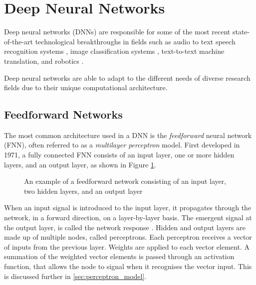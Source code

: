 \section{Deep Neural Networks}\label{sec:deep_neural_networks}
Deep neural networks (DNNs) are responsible for some of the most recent state-of-the-art technological breakthroughs in fields such as audio to text speech recognition systems \cite{Hinton2012}, image classification systems \cite{Krizhevsky2012, Simonyan2014, Szegedy2015, He2016}, text-to-text machine translation, and robotics \cite{Mnih2015, Lillicrap2015, Schulman2015, Schulman2015highdimensional}.

Deep neural networks are able to adapt to the different needs of diverse research fields due to their unique computational architecture.


\subsection{Feedforward Networks}\label{sec:feedfoorward_networks}
The most common architecture used in a DNN is the \textit{feedforward} neural network (FNN), often referred to as a \textit{multilayer perceptron} model. First developed in 1971, a fully connected FNN consists of an input layer, one or more hidden layers, and an output layer, as shown in Figure \ref{fig:2302_feedforward_network}.

\begin{figure}[h]
	\centering
	
	\caption[Feedforward network example]{An example of a feedforward network consisting of an input layer, two hidden layers, and an output layer}
	\label{fig:2302_feedforward_network}
\end{figure}

When an input signal is introduced to the input layer, it propagates through the network, in a forward direction, on a layer-by-layer basis. The emergent signal at the output layer, is called the network response \cite{Haykin99}. Hidden and output layers are made up of multiple nodes, called perceptrons. Each perceptron receives a vector of inputs from the previous layer. Weights are applied to each vector element. A summation of the weighted vector elements is passed through an activation function, that allows the node to signal when it recognises the vector input. This is discussed further in \textsection \ref{sec:perceptron_model}.

